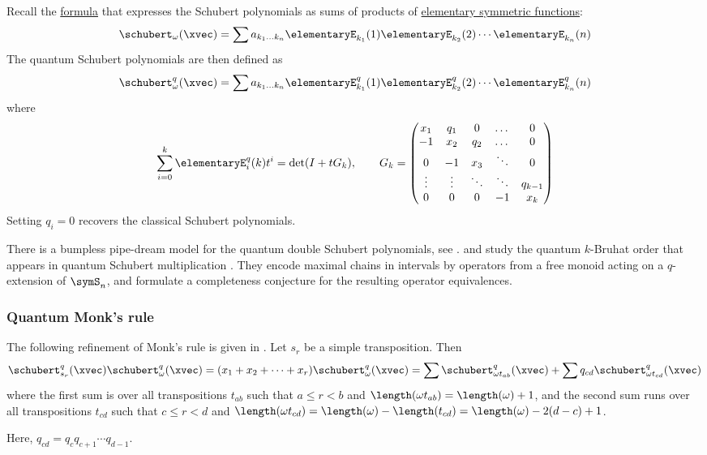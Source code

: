 Recall the \hyperref[schubertAsSumOfElementary]{formula}
that expresses the Schubert polynomials as sums of products of
\hyperref[elementaryE]{elementary symmetric functions}:
\[
\schubert_\omega(\xvec)
=
\sum a_{k_1 \dotsc k_n}
\elementaryE_{k_1}(1)\elementaryE_{k_2}(2) \dotsm \elementaryE_{k_n}(n)
\]
The quantum Schubert polynomials are then defined as
\[
\schubert^q_\omega(\xvec)
=
\sum a_{k_1 \dotsc k_n}
\elementaryE^{q}_{k_1}(1)
\elementaryE^{q}_{k_2}(2)
\dotsm
\elementaryE^{q}_{k_n}(n)
\]
where
\[
\sum_{i=0}^k \elementaryE^{q}_{i}(k)t^i = \det(I+tG_k),
\qquad
G_k=
\begin{pmatrix}
x_1 & q_1 & 0 & \dotsc & 0 \\
-1 & x_2 & q_2 & \dotsc & 0 \\
0 & -1 & x_3 & \ddots & 0 \\
\vdots & \vdots & \ddots & \ddots & q_{k-1} \\
0 & 0 & 0 & -1 & x_k
\end{pmatrix}
\]
Setting $q_i=0$ recovers the classical Schubert polynomials.


There is a bumpless pipe-dream model for the quantum double Schubert polynomials,
see \cite[Thm.~3.3]{LeOuyangTaoRestivoZhang2024x}.
 and  study the quantum
$k$-Bruhat order that appears in quantum Schubert multiplication
\cite{ColmenarejoMayers2026x}.  They encode maximal chains in intervals by
operators from a free monoid acting on a $q$-extension of $\symS_n$, and
formulate a completeness conjecture for the resulting operator equivalences.


\subsubsection[schubertQuantumMonksRule]{Quantum Monk's rule}

The following refinement of Monk's rule is given in
\cite[Thm.~7.1]{FominGelfandPostnikov1997}.
Let $s_r$ be a simple transposition. Then
\[
\schubert^q_{s_r}(\xvec) \schubert^q_\omega(\xvec) = 
(x_1+x_2+\dotsb + x_r) \schubert^q_\omega(\xvec) 
=
\sum \schubert^q_{\omega t_{ab}}(\xvec) +
\sum q_{cd} \schubert^q_{\omega t_{cd}}(\xvec)
\]
where the first sum is over all transpositions $t_{ab}$ such that $a\leq r \lt b$ and
$\length(\omega t_{ab}) = \length(\omega)+1$,
and the second sum runs over all
transpositions $t_{cd}$ such that $c\leq r \lt d$ and
$\length(\omega t_{cd}) = \length(\omega)-\length(t_{cd}) =
\length(\omega)-2(d-c)+1$.

Here, $q_{cd} = q_c q_{c+1} \dotsm q_{d-1}$.



